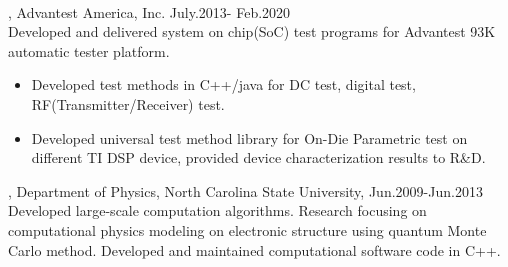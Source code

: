\documentclass[11pt]{article} %
\begin{document}
\\
, Advantest America, Inc. July.2013- Feb.2020\\
\noindent Developed and delivered system on chip(SoC) test programs for Advantest 93K automatic tester platform.\\ 
\begin{itemize}
    \item Developed test methods in C++/java for DC test, digital test, RF(Transmitter/Receiver) test.\\
 \vspace{-4mm}
    \item  Developed universal test method library for On-Die Parametric test on different TI DSP device, provided device characterization results to R\&D.\\ 
\vspace{-4mm}
 \end{itemize}
\vspace{1mm}
, Department of Physics, North Carolina State University, Jun.2009-Jun.2013\\
\noindent Developed large-scale computation algorithms. Research focusing on computational physics modeling on electronic structure using quantum Monte Carlo method. Developed and maintained computational software code in C++.\\
\end{document}
